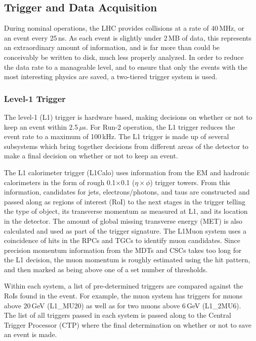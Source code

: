 \subsection{Trigger and Data Acquisition}
During nominal operations, the LHC provides collisions at a rate of 40\,MHz, or an event every 25\,ns.  As each event is slightly under 2\,MB of data, this represents an extraordinary amount of information, and is far more than could be conceivably be written to disk, much less properly analyzed.  In order to reduce the data rate to a manageable level, and to ensure that only the events with the most interesting physics are saved, a two-tiered trigger system is used.
\subsubsection{Level-1 Trigger}
The level-1 (L1) trigger is hardware based, making decisions on whether or not to keep an event within 2.5\,$\mu$s.  For Run-2 operation, the L1 trigger reduces the event rate to a maximum of 100\,kHz.  The L1 trigger is made up of several subsystems which bring together decisions from different areas of the detector to make a final decision on whether or not to keep an event.

The L1 calorimeter trigger (L1Calo) uses information from the EM and hadronic calorimeters in the form of rough 0.1$\times$0.1 ($\eta\times\phi$) trigger towers.  From this information, candidates for jets, electrons/photons, and taus are constructed and passed along as regions of interest (RoI) to the next stages in the trigger telling the type of object, its transverse momentum as measured at L1, and its location in the detector.  The amount of global missing transverse energy (MET) is also calculated and used as part of the trigger signature.  The L1Muon system uses a coincidence of hits in the RPCs and TGCs to identify muon candidates.  Since precision momentum information from the MDTs and CSCs takes too long for the L1 decision, the muon momentum is roughly estimated using the hit pattern, and then marked as being above one of a set number of \pt thresholds.

Within each system, a list of pre-determined triggers are compared against the RoIs found in the event.  For example, the muon system has triggers for muons above 20\,GeV (L1\_MU20) as well as for two muons above 6\,GeV (L1\_2MU6).  The list of all triggers passed in each system is passed along to the Central Trigger Processor (CTP) where the final determination on whether or not to save an event is made.

